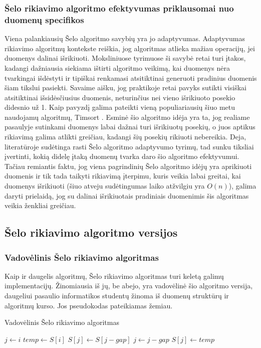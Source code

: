 \documentclass{VUMIFInfKursinis}
\begin{document}
\subsubsection{Šelo rikiavimo algoritmo efektyvumas priklausomai nuo duomenų specifikos}

Viena palankiausių Šelo algoritmo savybių yra jo adaptyvumas.
Adaptyvumas rikiavimo algoritmų kontekste reiškia, jog algoritmas atlieka mažiau operacijų, jei duomenys dalinai išrikiuoti.
Moksliniuose tyrimuose ši savybė retai turi įtakos, kadangi dažniausia siekiama ištirti algoritmo veikimą, kai duomenys
nėra tvarkingai išdėstyti ir tipiškai renkamasi atsitiktinai generuoti pradinius duomenis šiam tikslui pasiekti.
Savaime aišku, jog praktikoje retai pavyks sutikti visiškai atsitiktinai išsidėsčiusius duomenis, neturinčius nei vieno išrikiuoto posekio didesnio už 1.
Kaip pavyzdį galima pateikti vieną populiariausių šiuo metu naudojamų algoritmų, Timsort \cite{auger2018worst}. 
Esminė šio algoritmo idėja yra ta, jog realiame pasaulyje sutinkami duomenys labai dažnai turi išrikiuotų posekių,
o juos aptikus rikiavimą galima atlikti greičiau, kadangi šių posekių rikiuoti nebereikia.
Deja, literatūroje sudėtinga rasti Šelo algoritmo adaptyvumo tyrimų, tad sunku tiksliai įvertinti, kokią didelę įtaką duomenų tvarka daro šio algoritmo efektyvumui.
Tačiau remiantis faktu, jog viena pagrindinių Šelo algoritmo idėjų yra aprikiuoti duomenis ir tik tada taikyti rikiavimą įterpimu,
kuris veikia labai greitai, kai duomenys išrikiuoti (šiuo atveju sudėtingumas laiko atžvilgiu yra $O(n)$), galima daryti prielaidą,
jog su dalinai išrikiuotais pradiniais duomenimis šis algoritmas veikia ženkliai greičiau.

\subsection{Šelo rikiavimo algoritmo versijos}

\subsubsection{Vadovėlinis Šelo rikiavimo algoritmas}

Kaip ir daugelis algoritmų, Šelo rikiavimo algoritmas turi keletą galimų implementacijų.
Žinomiausia iš jų, be abejo, yra vadovėlinė šio algoritmo versija,
daugeliui pasaulio informatikos studentų žinoma iš duomenų struktūrų ir algoritmų kurso.
Jos pseudokodas pateikiamas žemiau.

\begin{algorithm}[H]
  \caption{Vadovėlinis Šelo rikiavimo algoritmas}\label{alg:tss}
  \begin{algorithmic}[1]
      \State $j\gets i$\label{alg:tss:assign1}
      \State $temp\gets S[i]$\label{alg:tss:assign2}
      \label{alg:tss:while}
        \State $S[j]\gets S[j - gap]$
        \State $j\gets j-gap$
      \EndWhile
      \State $S[j]\gets temp$
    \EndFor
  \EndFor
  \end{algorithmic}
\end{algorithm}
\end{document}
